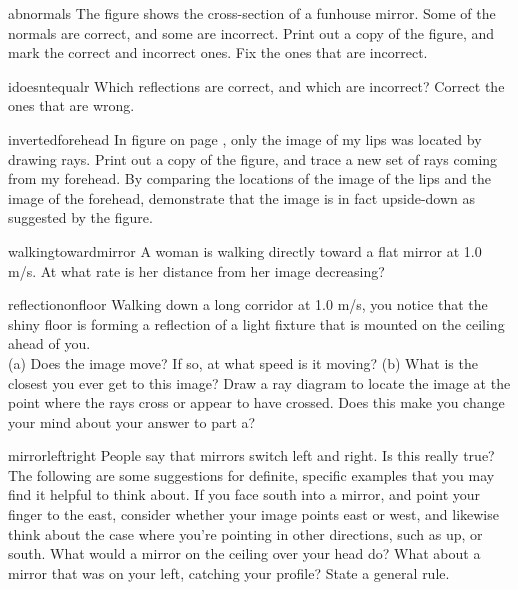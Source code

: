 \begin{hwsection}

\begin{hw}{abnormals}
The figure shows the cross-section of a funhouse mirror. Some of the normals
are correct, and some are incorrect. Print out a copy of the figure, and mark
the correct and incorrect ones. Fix the ones that are incorrect.
\end{hw}

\begin{hw}{idoesntequalr}
Which reflections are correct, and which are incorrect? Correct the ones that are wrong.
\end{hw}

\begin{hw}{invertedforehead}
In figure  on page \pageref{fig:inbendingmirrorreal},
only the image of my lips was located by drawing rays. Print out a copy
of the figure, and trace a new
set of rays coming from my forehead. By comparing the locations of the image of the
lips and the image of the forehead, demonstrate that the image is in fact upside-down
as suggested by the figure.
\end{hw}

\begin{hw}{walkingtowardmirror}
A woman is walking directly toward a flat mirror at 1.0 m/s. At what rate is
her distance from her image decreasing?
\end{hw}

\begin{hw}{reflectiononfloor}
Walking down a long corridor at 1.0 m/s, you notice that the shiny floor is forming
a reflection of a light fixture that is mounted on the ceiling ahead of you. \\
(a) Does the image move? If so, at what speed is it moving? \hwendpart
(b) What is the closest you ever get to this image? Draw a ray diagram to 
locate the image at the point where the rays cross or appear to have crossed.
Does this make you change your mind about your answer
to part a?
\end{hw}

\begin{hw}{mirrorleftright}
People say that mirrors switch left and right. Is this really true? The following are some
suggestions for definite, specific examples that you may find it helpful to think about.
If you face south into
a mirror, and point your finger to the east, consider whether your image points east or west,
and likewise think about the case where you're pointing in other directions, such as up, or
south. What would a mirror
on the ceiling over your head do? What about a mirror that was on your left, catching
your profile?  State a general rule.
\end{hw}


\end{hwsection}
